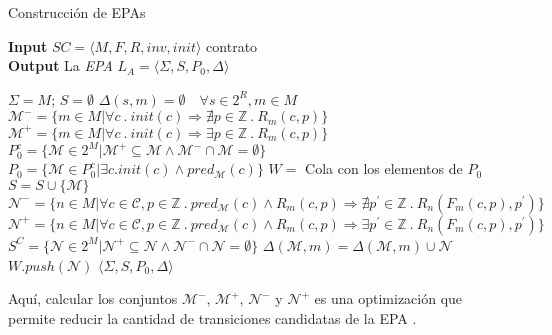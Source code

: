 \begin{algorithm}[H]
    \caption{Construcción de EPAs}
    \hspace*{\algorithmicindent} \textbf{Input} $SC = \langle M, F, R, inv, init \rangle$ contrato \\
    \hspace*{\algorithmicindent} \textbf{Output} La \textit{EPA} $L_A =\langle \Sigma, S, P_0, \Delta \rangle$
    \begin{algorithmic}[1]
        \State $\Sigma = M$; $S = \emptyset$
        \State $\Delta(s,m) = \emptyset \quad \forall s \in 2^R, m \in M$
        \State $\mathcal{M}^- = \{m \in M | \forall c \: . \: init(c) \Rightarrow \nexists p \in \mathds{Z} \: . \: R_m(c,p)\}$
        \State $\mathcal{M}^+ = \{m \in M | \forall c \: . \: init(c) \Rightarrow \exists p \in \mathds{Z} \: . \: R_m(c,p)\}$
        \State $P_0^c = \{\mathcal{M} \in 2^M | \mathcal{M}^+ \subseteq \mathcal{M} \land \mathcal{M}^- \cap \mathcal{M} = \emptyset \}$
        \State $P_0 = \{\mathcal{M} \in P_0^c | \exists c . init(c) \land pred_\mathcal{M}(c) \}$
        \State $W =$ Cola con los elementos de $P_0$
        \State $S = S \cup \{\mathcal{M}\}$
        \State $\mathcal{N}^- = \{n \in M | \forall c \in \mathcal{C}, p \in \mathds{Z} \: . \: pred_\mathcal{M}(c) \land R_m(c,p) \Rightarrow \nexists p^\prime \in \mathds{Z} \: . \: R_n(F_m(c,p),p^\prime)\}$
        \State $\mathcal{N}^+ = \{n \in M | \forall c \in \mathcal{C}, p \in \mathds{Z} \: . \: pred_\mathcal{M}(c) \land R_m(c,p) \Rightarrow \exists p^\prime \in \mathds{Z} \: . \: R_n(F_m(c,p),p^\prime)\}$
        \State $S^C = \{\mathcal{N} \in 2^M | \mathcal{N}^+ \subseteq \mathcal{N} \land \mathcal{N}^- \cap \mathcal{N} = \emptyset\}$
            \State $\Delta (\mathcal{M},m) = \Delta (\mathcal{M},m) \cup \mathcal{N}$
            \State $W.push(\mathcal{N})$
            \EndIf
            \EndIf
            \EndFor
            \EndFor
            \EndWhile
            \State \Return $\langle \Sigma, S, P_0, \Delta \rangle$
    \end{algorithmic}
\end{algorithm}

Aquí, calcular los conjuntos $\mathcal{M}^-$, $\mathcal{M}^+$, $\mathcal{N}^-$ y $\mathcal{N}^+$ es una optimización que permite reducir la cantidad de transiciones candidatas de la EPA \cite{de-caso-epa}.

